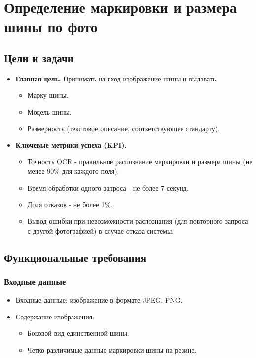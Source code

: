 \documentclass[12pt]{article}
\begin{document}
\section{Определение маркировки и размера шины по фото}
\label{sec:tire_classification}
\subsection{Цели и задачи}
\begin{itemize}
	\item \textbf{Главная цель.} Принимать на вход изображение шины и выдавать:
	      \begin{itemize}
		      \item Марку шины.
		      \item Модель шины.
		      \item Размерность (текстовое описание, соответствующее стандарту).
	      \end{itemize}
	\item \textbf{Ключевые метрики успеха (KPI).}
	      \begin{itemize}
		      \item Точность OCR - правильное распознание маркировки и размера шины (не менее 90\% для каждого поля).
		      \item Время обработки одного запроса - не более 7 секунд.
		      \item Доля отказов - не более 1\%.
		      \item Вывод ошибки при невозможности распознания (для повторного запроса с другой фотографией) в случае отказа системы.
	      \end{itemize}
\end{itemize}

\subsection{Функциональные требования}

\subsubsection{Входные данные}
\begin{itemize}
	\item Входные данные: изображение в формате JPEG, PNG.
	\item Содержание изображения:
	      \begin{itemize}
		      \item Боковой вид единственной шины.
		      \item Четко различимые данные маркировки шины на резине.
	      \end{itemize}
\end{itemize}
\end{document}
